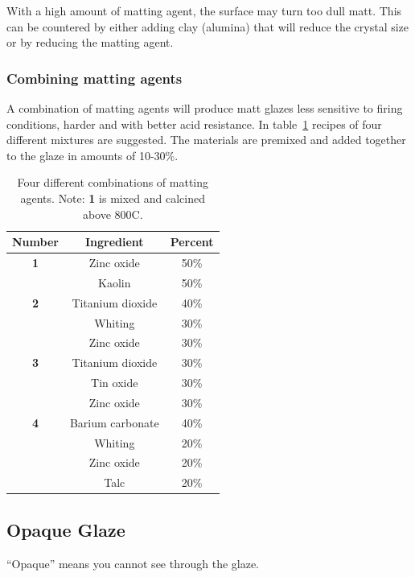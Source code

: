 With a high amount of matting agent, the surface may turn too dull matt. This 
can be countered by either adding clay (alumina) that will reduce the crystal 
size or by reducing the matting agent.
\subsubsection{Combining matting agents}
A combination of matting agents will produce matt glazes less sensitive to 
firing conditions, harder and with better acid resistance. In 
table~\ref{tab:combiningmattingagents} recipes of 
four different mixtures are suggested. The materials are premixed and added 
together to the glaze in amounts of 10-30\%.
\begin{center}
  \renewcommand{\arraystretch}{1.5}
  \begin{table}\centering
    \begin{tabular}{|c|c|c|}\hline
      \textbf{Number}&\textbf{Ingredient}&\textbf{Percent}\\\hline\hline
      \textbf{1}&Zinc oxide&50\%\\\hline
      &Kaolin&50\%\\\hline
      \textbf{2}&Titanium dioxide&40\%\\\hline
      &Whiting&30\%\\\hline
      &Zinc oxide&30\%\\\hline\hline
      \textbf{3}&Titanium dioxide&30\%\\\hline
&Tin oxide&30\%\\\hline
&Zinc oxide&30\%\\\hline\hline
\textbf{4}&Barium carbonate&40\%\\\hline
&Whiting&20\%\\\hline
&Zinc oxide&20\%\\\hline
&Talc&20\%\\\hline
    \end{tabular}
  \caption{Four different combinations of matting agents. {Note:} \textbf{1} is 
  mixed and calcined above 800\degree C.}
  \label{tab:combiningmattingagents}
  \end{table}
\end{center}
\subsection{Opaque Glaze}
``Opaque'' means you cannot see through the glaze. 

